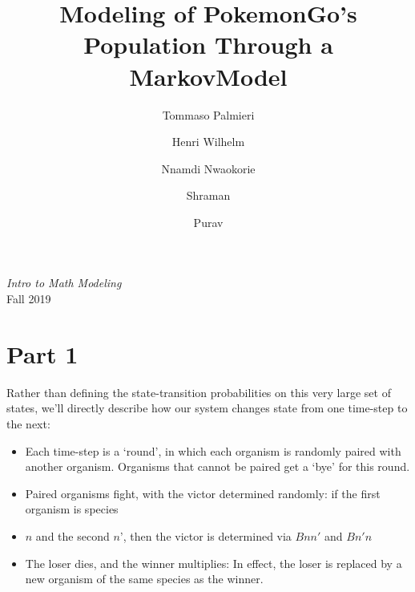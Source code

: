 \documentclass[border=1pt]{article}
\title{Modeling of PokemonGo's Population Through a MarkovModel}
\author[1]{Tommaso Palmieri}
\affil[1]{\footnotesize NetID: tp1438, Email: Tommaso.Palmieri@NYU.edu}
\author[2]{Henri Wilhelm}
\affil[2]{Email: hpv234@nyu.edu}
\author[3]{Nnamdi Nwaokorie}
\author[4]{Shraman}
\author[5]{Purav}
\begin{document}
\maketitle

\begin{center} %
	\textit{Intro to Math Modeling}\\
	Fall 2019
\end{center}
\section{Part 1}
Rather than defining the state-transition probabilities on this very large set of states, we’ll directly describe how our system changes state from one time-step to the next:
\begin{itemize}
\item Each time-step is a ‘round’, in which each organism is randomly paired with another organism. Organisms that cannot be paired get a ‘bye’ for this round.
\item Paired organisms fight, with the victor determined randomly: if the first organism is species
\item $ n $ and the second $ n’ $, then the victor is determined via $ Bnn ' $ and $ Bn' n $
\item The loser dies, and the winner multiplies: In effect, the loser is replaced by a new organism of the same species as the winner.
\end{itemize}
\end{document}
